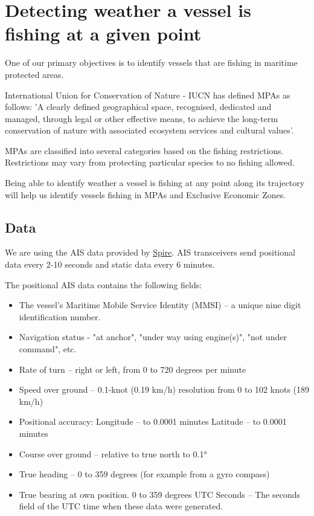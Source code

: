 \section{Detecting weather a vessel is fishing at a given point}
One of our primary objectives is to identify vessels that are fishing in maritime protected areas.

International Union for Conservation of Nature - IUCN has defined MPAs as follows:
'A clearly defined geographical space, recognised, dedicated and managed, through legal or other effective means, to achieve the long-term conservation of nature with associated ecosystem services and cultural values'.

MPAs are classified into several categories based on the fishing restrictions. Restrictions may vary from protecting particular species to no fishing allowed.

Being able to identify weather a vessel is fishing at any point along its trajectory will help us identify vessels fishing in MPAs and Exclusive Economic Zones.

\subsection{Data}

We are using the AIS data provided by \href{https://spire.com/}{Spire}.
AIS transceivers send positional data every 2-10 seconds and static data every 6 minutes.

The positional AIS data contains the following fields:
\begin{itemize}
\item The vessel's Maritime Mobile Service Identity (MMSI) – a unique nine digit identification number.
\item Navigation status - "at anchor", "under way using engine(s)", "not under command", etc.
\item Rate of turn – right or left, from 0 to 720 degrees per minute
\item Speed over ground – 0.1-knot (0.19 km/h) resolution from 0 to 102 knots (189 km/h)
\item Positional accuracy:
Longitude – to 0.0001 minutes
Latitude – to 0.0001 minutes
\item Course over ground – relative to true north to 0.1°
\item True heading – 0 to 359 degrees (for example from a gyro compass)
\item True bearing at own position. 0 to 359 degrees
UTC Seconds – The seconds field of the UTC time when these data were generated.
\end{itemize}

